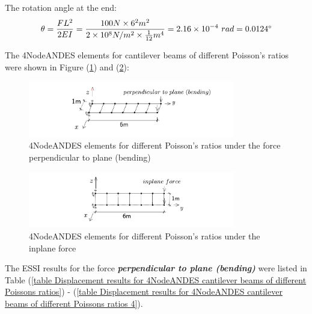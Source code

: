 \documentclass[fleqn,11pt]{article}
\begin{document}
The rotation angle at the end:
\begin{equation}
  \theta =\frac{FL^2}{2EI} 
   =\frac{100 N \times 6^2 m^2} {2\times 10^8 N/m^2 \times \frac{1}{12} m^4} 
 =2.16 \times 10^{-4} \ rad = 0.0124 \degree 
\end{equation}

The 4NodeANDES elements for cantilever beams of different Poisson's ratios were shown in Figure (\ref{fig 4NodeANDES elements for cantilever beams of different Poisson's ratios}) and (\ref{fig 4NodeANDES elements for cantilever beams of different Poisson's ratios 2}):

\begin{figure}[H]
  \centering
  \includegraphics[width=9cm]{../Figure-files/beam_ANDES_xy_bending_6div.pdf}
  \captionsetup{justification=centering,margin=3cm}
  \caption{4NodeANDES elements for different Poisson's ratios under the force perpendicular to plane (bending)}
  \label{fig 4NodeANDES elements for cantilever beams of different Poisson's ratios}
\end{figure}


\begin{figure}[H]
  \centering
  \includegraphics[width=9cm]{../Figure-files/beam_ANDES_yz_inPlane_6div.pdf}
  \captionsetup{justification=centering,margin=3cm}
  \caption{4NodeANDES elements for different Poisson's ratios under the inplane force}
  \label{fig 4NodeANDES elements for cantilever beams of different Poisson's ratios 2}
\end{figure}


The ESSI results for the force \textbf{\emph{perpendicular to plane (bending)}} were listed in Table (\ref{table Displacement results for 4NodeANDES cantilever beams of different Poissons ratios}) - (\ref{table Displacement results for 4NodeANDES cantilever beams of different Poissons ratios 4}).
\end{document}

